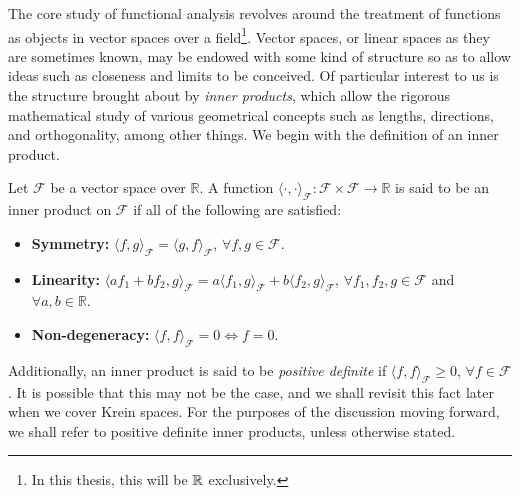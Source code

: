 The core study of functional analysis revolves around the treatment of functions as objects in vector spaces over a field\footnote{In this thesis, this will be $\mathbb{R}$ exclusively.}.
Vector spaces, or linear spaces as they are sometimes known, may be endowed with some kind of structure so as to allow ideas such as closeness and limits to be conceived.
Of particular interest to us is the structure brought about by \emph{inner products}, which allow the rigorous mathematical study of various geometrical concepts such as lengths, directions, and orthogonality, among other things.
We begin with the definition of an inner product. 

\begin{definition}\label{def:innerprod}
	Let $\mathcal F$ be a vector space over $\mathbb R$. A function $\langle\cdot,\cdot\rangle_{\mathcal F}:\mathcal F \times \mathcal F \rightarrow \mathbb R$ is said to be an inner product on $\mathcal F$ if all of the following are satisfied:
	\begin{itemize}
	\item \textbf{Symmetry:} $\langle f, g\rangle_{\mathcal F} = \langle g, f	\rangle_{\mathcal F}$, $\forall f,g \in \mathcal F$.
	\item \textbf{Linearity:} $\langle a f_1 + b f_2, g\rangle_{\mathcal F} = a\langle f_1,g \rangle_{\mathcal F} + b\langle f_2,g \rangle_{\mathcal F}$, $\forall f_1, f_2, g \in \mathcal F$ and $\forall a,b \in \mathbb R$.
	\item \textbf{Non-degeneracy:} $\langle f, f\rangle_{\mathcal F} = 0 \Leftrightarrow f=0$.
	\end{itemize}
\end{definition}

Additionally, an inner product is said to be \emph{positive definite} if $\langle f, f\rangle_{\mathcal F} \geq 0$, $\forall f \in \mathcal F$.
It is possible that this may not be the case, and we shall revisit this fact later when we cover Krein spaces.
For the purposes of the discussion moving forward, we shall refer to positive definite inner products, unless otherwise stated.

